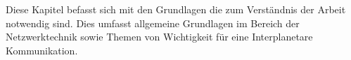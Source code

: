 \label{cap:grundlagen}
Diese Kapitel befasst sich mit den Grundlagen die zum Verst{\"a}ndnis der Arbeit
notwendig sind. Dies umfasst allgemeine Grundlagen im Bereich der
Netzwerktechnik sowie Themen von Wichtigkeit f{\"u}r eine Interplanetare Kommunikation.
